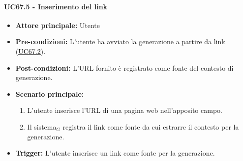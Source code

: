 \documentclass[a4paper, 10pt]{article}
\newcommand{\uclink}[2]{\hyperlink{#1}{\textcolor{black}{\underline{#2}}}}
\begin{document}
\paragraph{UC67.5 - Inserimento del link}
\hypertarget{uc:67.5}{}
\begin{itemize}
    \item \textbf{Attore principale:} Utente
    \item \textbf{Pre-condizioni:} L'utente ha avviato la generazione a partire da link (\uclink{uc:67.2}{UC67.2}).
    \item \textbf{Post-condizioni:} L'URL fornito è registrato come fonte del contesto di generazione.
    \item \textbf{Scenario principale:}
    \begin{enumerate}
        \item L'utente inserisce l'URL di una pagina web nell'apposito campo.
        \item Il sistema$_G$ registra il link come fonte da cui estrarre il contesto per la generazione.
    \end{enumerate}
    \item \textbf{Trigger:} L'utente inserisce un link come fonte per la generazione.
\end{itemize}

\hypertarget{uc:68}{}
\end{document}

